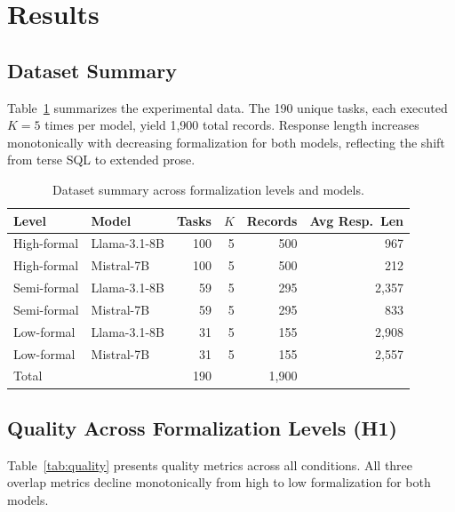 \documentclass[runningheads]{llncs}
\begin{document}
\section{Results}
\label{sec:results}

\subsection{Dataset Summary}

Table~\ref{tab:dataset} summarizes the experimental data. The 190 unique tasks, each executed $K\!=\!5$ times per model, yield 1,900 total records. Response length increases monotonically with decreasing formalization for both models, reflecting the shift from terse SQL to extended prose.

\begin{table}[h]
\centering
\caption{Dataset summary across formalization levels and models.}
\label{tab:dataset}
\begin{tabular}{llrrrr}
\toprule
Level & Model & Tasks & $K$ & Records & Avg Resp.\ Len \\
\midrule
High-formal & Llama-3.1-8B   & 100 & 5 & 500 & 967 \\
High-formal & Mistral-7B     & 100 & 5 & 500 & 212 \\
Semi-formal & Llama-3.1-8B   &  59 & 5 & 295 & 2{,}357 \\
Semi-formal & Mistral-7B     &  59 & 5 & 295 & 833 \\
Low-formal  & Llama-3.1-8B   &  31 & 5 & 155 & 2{,}908 \\
Low-formal  & Mistral-7B     &  31 & 5 & 155 & 2{,}557 \\
\midrule
\multicolumn{2}{l}{Total} & 190 & & 1{,}900 & \\
\bottomrule
\end{tabular}
\end{table}

\subsection{Quality Across Formalization Levels (H1)}
\label{sec:quality}

Table~\ref{tab:quality} presents quality metrics across all conditions. All three overlap metrics decline monotonically from high to low formalization for both models.
\end{document}
